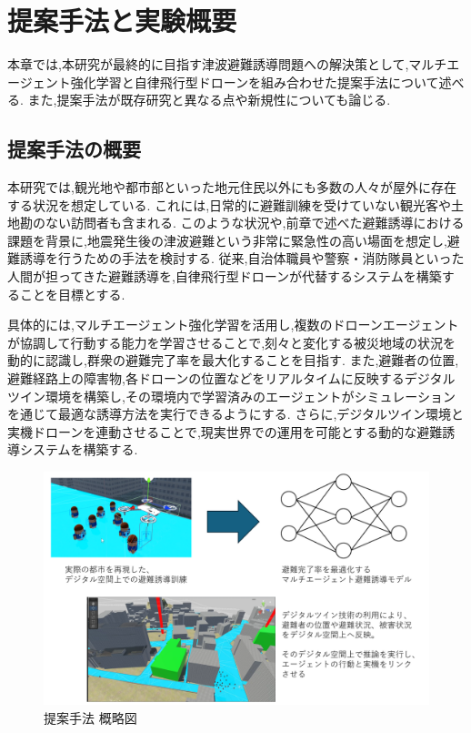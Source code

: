 \chapter{提案手法と実験概要}  
本章では,本研究が最終的に目指す津波避難誘導問題への解決策として,マルチエージェント強化学習と自律飛行型ドローンを組み合わせた提案手法について述べる.
また,提案手法が既存研究と異なる点や新規性についても論じる.

\section{提案手法の概要} 
\label{sec:sug} 
本研究では,観光地や都市部といった地元住民以外にも多数の人々が屋外に存在する状況を想定している.
これには,日常的に避難訓練を受けていない観光客や土地勘のない訪問者も含まれる.
このような状況や,前章で述べた避難誘導における課題を背景に,地震発生後の津波避難という非常に緊急性の高い場面を想定し,避難誘導を行うための手法を検討する.
従来,自治体職員や警察・消防隊員といった人間が担ってきた避難誘導を,自律飛行型ドローンが代替するシステムを構築することを目標とする.

具体的には,マルチエージェント強化学習を活用し,複数のドローンエージェントが協調して行動する能力を学習させることで,刻々と変化する被災地域の状況を動的に認識し,群衆の避難完了率を最大化することを目指す.
また,避難者の位置,避難経路上の障害物,各ドローンの位置などをリアルタイムに反映するデジタルツイン環境を構築し,その環境内で学習済みのエージェントがシミュレーションを通じて最適な誘導方法を実行できるようにする.
さらに,デジタルツイン環境と実機ドローンを連動させることで,現実世界での運用を可能とする動的な避難誘導システムを構築する.

\begin{figure}[H] 
  \centering 
  \includegraphics[width=1.0\textwidth]{Figures/2024-12-06 182816.png}
  \caption{提案手法 概略図} 
  \label{fig:01} 
\end{figure}

